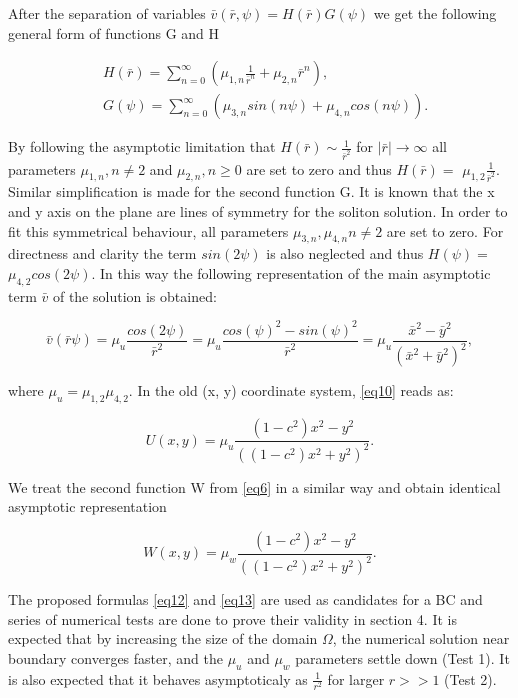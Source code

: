 \documentclass[12pt]{article}
\theoremstyle{theorem}
\theoremstyle{defi}
\begin{document}
After the separation of variables $\bar{v}(\bar{r}, \psi) = H(\bar{r})G(\psi)$  we get the following general form of functions G and H 

\begin{align}
&H(\bar{r}) = \sum^{\infty}_{n=0} (\mu_{1,n} \frac{1}{ \bar{r}^n} + \mu_{2,n} \bar{r}^n ),
\\ \nonumber &G(\psi) = \sum^{\infty}_{n=0} (\mu_{3,n}sin(n \psi ) + \mu_{4,n}cos(n \psi)). \label{eq9}
\end{align}

By following the asymptotic limitation that $H(\bar{r}) \sim \frac{1}{\bar{r}^2} $  for $|\bar{r}| \rightarrow \infty $ all parameters $\mu_{1,n}, n \neq 2$ and $\mu_{2,n},  n \geq 0$  are set to zero  and thus $H(\bar{r}) =$ $\mu_{1,2} \frac{1}{ \bar{r}^2 }$.
Similar simplification is made for the second function G. It is known that the x and y axis on the plane are lines of symmetry for the soliton solution. In order to fit this symmetrical behaviour, all parameters $\mu_{3,n},\mu_{4,n}  n \neq 2$  are set to zero. For directness and clarity the term $sin(2\psi)$ is also neglected and thus $H(\psi) = $ $\mu_{4,2} cos(2 \psi)$. In this way the following representation of the main asymptotic term $\bar{v}$ of the solution is obtained:

\begin{equation}
\bar{v}(\bar{r} \psi) = \mu_u \frac{cos(2 \psi)}{ \bar{r}^2 } = 
 \mu_u \frac{cos(\psi) ^ 2 - sin(\psi)^2}{ \bar{r}^2 } = 
 \mu_u \frac{\bar{x}  ^ 2 - \bar{y}  ^ 2}{( \bar{x}  ^ 2 + \bar{y}  ^ 2)^2 } , \label{eq10}
\end{equation}

where $\mu_u = \mu_{1,2} \mu_{4,2}$. In the old (x, y) coordinate system, \eqref{eq10}  reads as:

\begin{equation}
U(x,y) = \mu_u \frac{(1-c^2)x^2 - y^2}{ ( (1-c^2)x^2 + y^2 )^2 }. \label{eq12}
\end{equation}

We treat the second function W from \eqref{eq6}  in a similar way and obtain identical asymptotic representation

\begin{equation}
W(x,y) = \mu_w \frac{(1-c^2)x^2 - y^2}{ ( (1-c^2)x^2 + y^2 )^2 }. \label{eq13}
\end{equation}


The proposed formulas \eqref{eq12} and \eqref{eq13} are used as candidates for a BC and series of numerical tests are done to prove their validity in section 4. 
It is expected that by increasing the size of the domain $\Omega$, the numerical solution near boundary converges faster, and the $\mu_u$ and $\mu_w$ parameters settle down (Test 1). It is also expected that it behaves asymptoticaly as $\frac{1}{r^2}$ for larger $r >> 1$ (Test 2).
\end{document}
